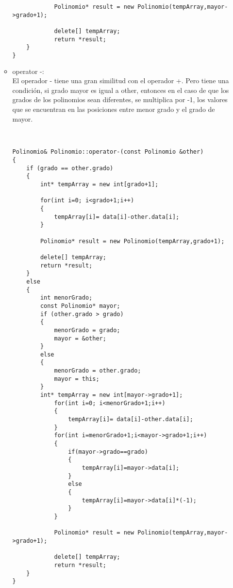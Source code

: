 \documentclass[11pt]{article}
\begin{document}
\begin{enumerate}
\begin{itemize}
\begin{lstlisting}
            Polinomio* result = new Polinomio(tempArray,mayor->grado+1);
        
            delete[] tempArray;
            return *result;
    }
}
\end{lstlisting}

\item operator -:\\
El operador - tiene una gran similitud con el operador +. Pero tiene una condici\'on, si grado mayor es igual a other, entonces en el caso de que los grados de los polinomios sean diferentes, se multiplica por -1, los valores que se encuentran en las posiciones entre menor grado y el grado de mayor.
\\
\\
\begin{lstlisting}

Polinomio& Polinomio::operator-(const Polinomio &other)
{
    if (grado == other.grado)
    {
        int* tempArray = new int[grado+1];
        
        for(int i=0; i<grado+1;i++)
        {
            tempArray[i]= data[i]-other.data[i];
        }
        
        Polinomio* result = new Polinomio(tempArray,grado+1);
        
        delete[] tempArray;
        return *result;
    }
    else
    {
        int menorGrado;
        const Polinomio* mayor;
        if (other.grado > grado)
        {
            menorGrado = grado;
            mayor = &other;
        }
        else
        {
            menorGrado = other.grado;
            mayor = this;
        }
        int* tempArray = new int[mayor->grado+1];
            for(int i=0; i<menorGrado+1;i++)
            {
                tempArray[i]= data[i]-other.data[i];
            }
            for(int i=menorGrado+1;i<mayor->grado+1;i++)
            {
                if(mayor->grado==grado)
                {
                    tempArray[i]=mayor->data[i];
                }
                else
                {
                    tempArray[i]=mayor->data[i]*(-1);
                } 
            }
          
            Polinomio* result = new Polinomio(tempArray,mayor->grado+1);
        
            delete[] tempArray;
            return *result;
    }
}
\end{lstlisting}


\end{itemize}
\end{enumerate}
\end{document}
